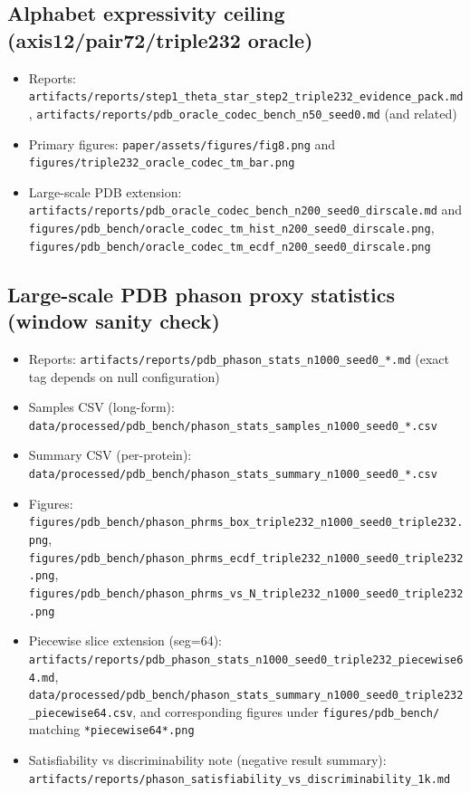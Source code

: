 \subsection*{Alphabet expressivity ceiling (axis12/pair72/triple232 oracle)}
\begin{itemize}
  \item Reports: \texttt{artifacts/reports/step1\_theta\_star\_step2\_triple232\_evidence\_pack.md}, \texttt{artifacts/reports/pdb\_oracle\_codec\_bench\_n50\_seed0.md} (and related)
  \item Primary figures: \texttt{paper/assets/figures/fig8.png} and \texttt{figures/triple232\_oracle\_codec\_tm\_bar.png}
  \item Large-scale PDB extension: \texttt{artifacts/reports/pdb\_oracle\_codec\_bench\_n200\_seed0\_dirscale.md} and \texttt{figures/pdb\_bench/oracle\_codec\_tm\_hist\_n200\_seed0\_dirscale.png}, \texttt{figures/pdb\_bench/oracle\_codec\_tm\_ecdf\_n200\_seed0\_dirscale.png}
\end{itemize}

\subsection*{Large-scale PDB phason proxy statistics (window sanity check)}
\begin{itemize}
  \item Reports: \texttt{artifacts/reports/pdb\_phason\_stats\_n1000\_seed0\_*.md} (exact tag depends on null configuration)
  \item Samples CSV (long-form): \texttt{data/processed/pdb\_bench/phason\_stats\_samples\_n1000\_seed0\_*.csv}
  \item Summary CSV (per-protein): \texttt{data/processed/pdb\_bench/phason\_stats\_summary\_n1000\_seed0\_*.csv}
  \item Figures: \texttt{figures/pdb\_bench/phason\_phrms\_box\_triple232\_n1000\_seed0\_triple232.png}, \texttt{figures/pdb\_bench/phason\_phrms\_ecdf\_triple232\_n1000\_seed0\_triple232.png}, \texttt{figures/pdb\_bench/phason\_phrms\_vs\_N\_triple232\_n1000\_seed0\_triple232.png}
  \item Piecewise slice extension (seg=64): \texttt{artifacts/reports/pdb\_phason\_stats\_n1000\_seed0\_triple232\_piecewise64.md}, \texttt{data/processed/pdb\_bench/phason\_stats\_summary\_n1000\_seed0\_triple232\_piecewise64.csv}, and corresponding figures under \texttt{figures/pdb\_bench/} matching \texttt{*piecewise64*.png}
  \item Satisfiability vs discriminability note (negative result summary): \texttt{artifacts/reports/phason\_satisfiability\_vs\_discriminability\_1k.md}
\end{itemize}

